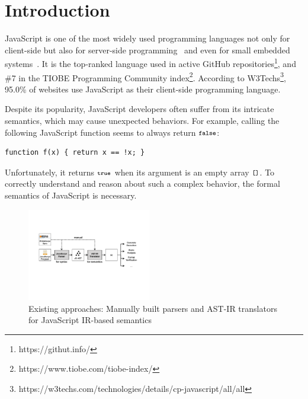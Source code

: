 \section{Introduction}
JavaScript is one of the most widely used programming languages not only for
client-side but also for server-side programming~\cite{nodejs, meanjs} and even
for small embedded systems~\cite{espruino, tessel2}.  It is the top-ranked
language used in active GitHub repositories\footnote{https://githut.info/}, and
\#7 in the TIOBE Programming Community
index\footnote{https://www.tiobe.com/tiobe-index/}.  According to
W3Techs\footnote{https://w3techs.com/technologies/details/cp-javascript/all/all},
95.0\% of websites use JavaScript as their client-side programming language.

Despite its popularity, JavaScript developers often suffer from its intricate
semantics, which may cause unexpected behaviors.  For example, calling the
following JavaScript function seems to always return \( \texttt{\footnotesize false} \):
\begin{lstlisting}[style=myJSstyle]
        function f(x) { return x == !x; }
\end{lstlisting}
Unfortunately, it returns \( \texttt{\footnotesize true} \) when its argument
is an empty array \( \texttt{\footnotesize[]} \).  To correctly understand and reason about
such a complex behavior, the formal semantics of JavaScript is necessary.

\begin{figure}
  \centering
  \includegraphics[width=0.48\textwidth]{img/existing.pdf}
\vspace*{-2em}
  \caption{Existing approaches: Manually built parsers and AST-IR
  translators for JavaScript IR-based semantics}
  \label{fig:existing}
\vspace*{-1em}
\end{figure}

